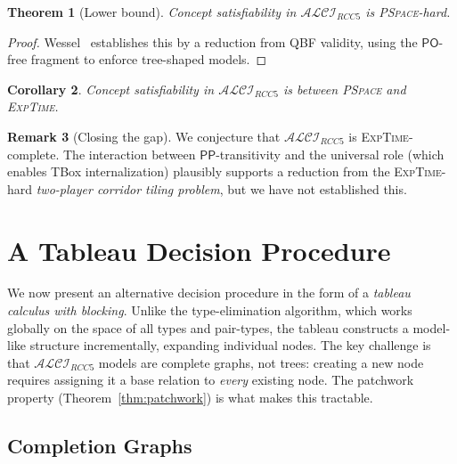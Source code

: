 \documentclass[a4paper,11pt]{article}
\newtheorem{theorem}{Theorem}[section]
\newtheorem{corollary}[theorem]{Corollary}
\theoremstyle{definition}
\newtheorem{remark}[theorem]{Remark}
\newcommand{\ALCIRCC}[1]{\ensuremath{\mathcal{ALCI}_{\mathit{RCC#1}}}}
\newcommand{\PO}{\ensuremath{\mathsf{PO}}}
\newcommand{\PP}{\ensuremath{\mathsf{PP}}}
\newcommand{\EXPTIME}{\textsc{ExpTime}}
\newcommand{\PSPACE}{\textsc{PSpace}}
\begin{document}
\begin{theorem}[Lower bound]
\label{thm:lower}
Concept satisfiability in $\ALCIRCC{5}$ is \PSPACE-hard.
\end{theorem}

\begin{proof}
Wessel~\cite[Section 6.3]{Wessel2003} establishes this by a reduction
from QBF validity, using the $\PO$-free fragment to enforce
tree-shaped models.
\end{proof}

\begin{corollary}
Concept satisfiability in $\ALCIRCC{5}$ is between \PSPACE{} and
\EXPTIME.
\end{corollary}

\begin{remark}[Closing the gap]
We conjecture that $\ALCIRCC{5}$ is \EXPTIME-complete.  The
interaction between $\PP$-transitivity and the universal role (which
enables TBox internalization) plausibly supports a reduction from the
\EXPTIME-hard \emph{two-player corridor tiling problem}, but we have
not established this.
\end{remark}


\section{A Tableau Decision Procedure}
\label{sec:tableau}

We now present an alternative decision procedure in the form of a
\emph{tableau calculus with blocking}.  Unlike the type-elimination
algorithm, which works globally on the space of all types and
pair-types, the tableau constructs a model-like structure
incrementally, expanding individual nodes.  The key challenge is that
$\ALCIRCC{5}$ models are complete graphs, not trees: creating a new
node requires assigning it a base relation to \emph{every} existing
node.  The patchwork property (Theorem~\ref{thm:patchwork}) is what
makes this tractable.

\subsection{Completion Graphs}
\end{document}
